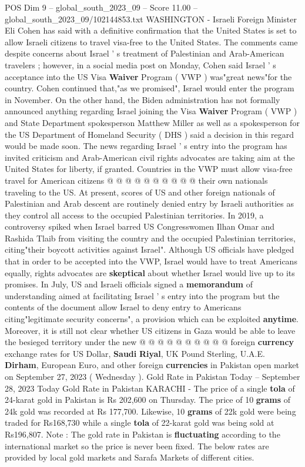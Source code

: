 \begin{textsample}{POS Dim 9 – global\_south\_2023\_09 – Score 11.00 – global\_south\_2023\_09/102144853.txt}  \label{ex:f9_pos_002}
WASHINGTON - Israeli Foreign Minister Eli Cohen has said with a definitive confirmation that the United States is set to allow Israeli citizens to travel visa-free to the United States.
The comments came despite concerns about Israel ' s treatment of Palestinian and Arab-American travelers ; however, in a social media post on Monday, Cohen said Israel ' s acceptance into the US Visa \textbf{Waiver} Program ( VWP ) was"great news"for the country.
Cohen continued that,"as we promised", Israel would enter the program in November.
On the other hand, the Biden administration has not formally announced anything regarding Israel joining the Visa \textbf{Waiver} Program ( VWP ) and State Department spokesperson Matthew Miller as well as a spokesperson for the US Department of Homeland Security ( DHS ) said a decision in this regard would be made soon.
The news regarding Israel ' s entry into the program has invited criticism and Arab-American civil rights advocates are taking aim at the United States for liberty, if granted.
Countries in the VWP must allow visa-free travel for American citizens @ @ @ @ @ @ @ @ @ @ their own nationals traveling to the US.
At present, scores of US and other foreign nationals of Palestinian and Arab descent are routinely denied entry by Israeli authorities as they control all access to the occupied Palestinian territories.
In 2019, a controversy spiked when Israel barred US Congresswomen Ilhan Omar and Rashida Tlaib from visiting the country and the occupied Palestinian territories, citing"their boycott activities against Israel".
Although US officials have pledged that in order to be accepted into the VWP, Israel would have to treat Americans equally, rights advocates are \textbf{skeptical} about whether Israel would live up to its promises.
In July, US and Israeli officials signed a \textbf{memorandum} of understanding aimed at facilitating Israel ' s entry into the program but the contents of the document allow Israel to deny entry to Americans citing"legitimate security concerns", a provision which can be exploited \textbf{anytime}.
Moreover, it is still not clear whether US citizens in Gaza would be able to leave the besieged territory under the new @ @ @ @ @ @ @ @ @ @ foreign \textbf{currency} exchange rates for US Dollar, \textbf{Saudi} \textbf{Riyal}, UK Pound Sterling, U.A.E. \textbf{Dirham}, European Euro, and other foreign \textbf{currencies} in Pakistan open market on September 27, 2023 ( Wednesday ).
Gold Rate in Pakistan Today -- September 28, 2023 Today Gold Rate in Pakistan KARACHI - The price of a single \textbf{tola} of 24-karat gold in Pakistan is Rs 202,600 on Thursday.
The price of 10 \textbf{grams} of 24k gold was recorded at Rs 177,700.
Likewise, 10 \textbf{grams} of 22k gold were being traded for Rs168,730 while a single \textbf{tola} of 22-karat gold was being sold at Rs196,807.
Note : The gold rate in Pakistan is \textbf{fluctuating} according to the international market so the price is never been fixed.
The below rates are provided by local gold markets and Sarafa Markets of different cities.

\end{textsample}
